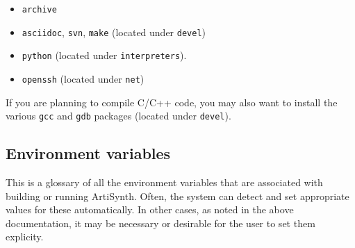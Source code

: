 \begin{itemize}

\item {\tt archive}
\item {\tt asciidoc}, {\tt svn}, {\tt make} (located under {\tt devel})
\item {\tt python} (located under {\tt interpreters}).
\item {\tt openssh} (located under {\tt net})

\end{itemize}

If you are planning to compile C/C++ code, you may also want to
install the various {\tt gcc} and {\tt gdb} packages (located under {\tt devel}).
\fi

\subsection{Environment variables}
\label{EnvironmentVariables}

This is a glossary of all the environment variables that are
associated with building or running ArtiSynth. Often, the system can
detect and set appropriate values for these automatically. In other
cases, as noted in the above documentation, it may be necessary or
desirable for the user to set them explicity.

